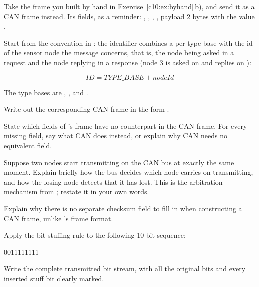 
\label{c10:ex:ascan}
Take the  frame you built by hand in Exercise~\ref{c10:ex:byhand}\,b), and send it
as a CAN frame instead. Its fields, as a reminder: , ,
, , payload 2 bytes with the value .

Start from the convention in : the identifier combines a per-type base with
the id of the sensor node the message concerns, that is, the node being asked in a request and the
node replying in a response (node 3 is asked on  and replies on ):

\[ \mathit{ID} = \mathit{TYPE\_BASE} + \mathit{nodeId} \]

The type bases are , ,  and
.

 Write out the corresponding CAN frame in the form .

 State which fields of 's frame have no counterpart in the CAN
frame. For every missing field, say what CAN does instead, or explain why CAN needs no equivalent
field.

 Suppose two nodes start transmitting on the CAN bus at exactly the same moment. Explain
briefly how the bus decides which node carries on transmitting, and how the losing node detects that
it has lost. This is the arbitration mechanism from ; restate it in your
own words.

 Explain why there is no separate checksum field to fill in when constructing a CAN frame,
unlike 's frame format.


\label{c10:ex:stuffing}
 Apply the bit stuffing rule to the following 10-bit sequence:

\begin{textdrawing}
0011111111
\end{textdrawing}

Write the complete transmitted bit stream, with all the original bits and every inserted stuff bit
clearly marked.


